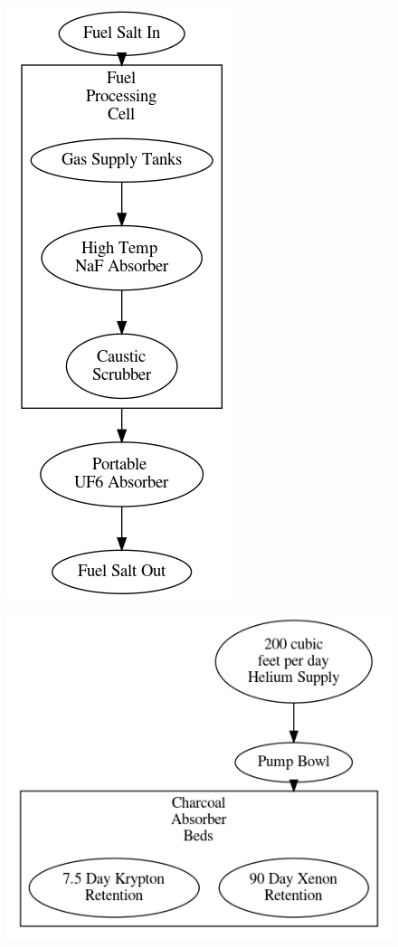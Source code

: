 \documentclass[letterpaper]{article}
\begin{document}
\begin{figure}[H]
  \centering
  \includegraphics[height=.5\textheight]{figures/msre-proc.png}
  \label{fig:figA}
\end{figure}

\begin{figure}[H]
  \centering
  \includegraphics[height=.5\textheight]{figures/msre-offgas.png}
  \label{fig:figB}
\end{figure}
\end{document}
